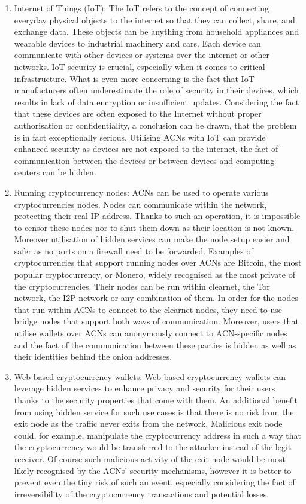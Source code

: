 \begin{enumerate}
    \item Internet of Things (IoT): The IoT refers to the concept of connecting everyday physical objects to the internet so that they can collect, share, and exchange data. These objects can be anything from household appliances and wearable devices to industrial machinery and cars. Each device can communicate with other devices or systems over the internet or other networks. IoT security is crucial, especially when it comes to critical infrastructure. What is even more concerning is the fact that IoT manufacturers often underestimate the role of security in their devices, which results in lack of data encryption or insufficient updates. Considering the fact that these devices are often exposed to the Internet without proper authorisation or confidentiality, a conclusion can be drawn, that the problem is in fact exceptionally serious.
    Utilising ACNs with IoT can provide enhanced security as devices are not exposed to the internet, the fact of communication between the devices or between devices and computing centers can be hidden.
    \item Running cryptocurrency nodes: ACNs can be used to operate various cryptocurrencies nodes. Nodes can communicate within the network, protecting their real IP address. Thanks to such an operation, it is impossible to censor these nodes nor to shut them down as their location is not known. Moreover utilisation of hidden services can make the node setup easier and safer as no ports on a firewall need to be forwarded. Examples of cryptocurrencies that support running nodes over ACNs are Bitcoin, the most popular cryptocurrency, or Monero, widely recognised as the most private of the cryptocurrencies. Their nodes can be run within clearnet, the Tor network, the I2P network or any combination of them. In order for the nodes that run within ACNs to connect to the clearnet nodes, they need to use bridge nodes that support both ways of communication. Moreover, users that utilise wallets over ACNs can anonymously connect to ACN-specific nodes and the fact of the communication between these parties is hidden as well as their identities behind the onion addresses.
    \item Web-based cryptocurrency wallets: Web-based cryptocurrency wallets can leverage hidden services to enhance privacy and security for their users thanks to the security properties that come with them. An additional benefit from using hidden service for such use cases is that there is no risk from the exit node as the traffic never exits from the network. Malicious exit node could, for example, manipulate the cryptocurrency address in such a way that the cryptocurrency would be transferred to the attacker instead of the legit receiver. Of course such malicious activity of the exit node would be most likely recognised by the ACNs’ security mechanisms, however it is better to prevent even the tiny risk of such an event, especially considering the fact of irreversibility of the cryptocurrency transactions and potential losses.

\end{enumerate}
